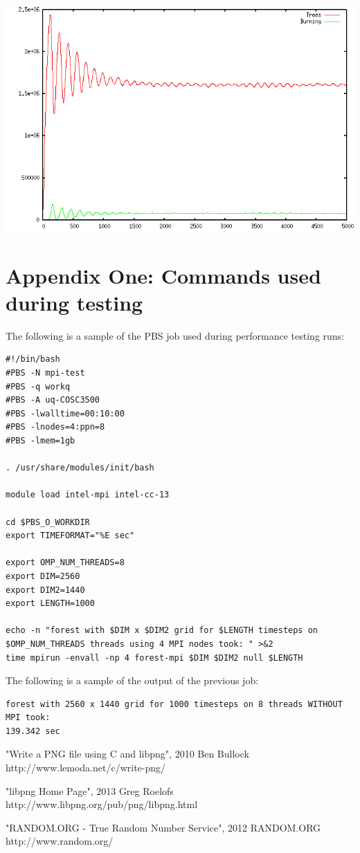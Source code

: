 \documentclass[11pt,a4paper]{report}
\begin{document}
\includegraphics[scale=0.8]{tex/graph}


\newpage

\appendix
\chapter{Appendix One: Commands used during testing}

The following is a sample of the PBS job used during performance testing runs:
\begin{verbatim}
#!/bin/bash
#PBS -N mpi-test
#PBS -q workq
#PBS -A uq-COSC3500
#PBS -lwalltime=00:10:00
#PBS -lnodes=4:ppn=8
#PBS -lmem=1gb

. /usr/share/modules/init/bash

module load intel-mpi intel-cc-13

cd $PBS_O_WORKDIR
export TIMEFORMAT="%E sec"

export OMP_NUM_THREADS=8
export DIM=2560
export DIM2=1440
export LENGTH=1000

echo -n "forest with $DIM x $DIM2 grid for $LENGTH timesteps on
$OMP_NUM_THREADS threads using 4 MPI nodes took: " >&2
time mpirun -envall -np 4 forest-mpi $DIM $DIM2 null $LENGTH
\end{verbatim}

The following is a sample of the output of the previous job:
\begin{verbatim}
forest with 2560 x 1440 grid for 1000 timesteps on 8 threads WITHOUT MPI took:
139.342 sec
\end{verbatim}

\begin{thebibliography}{99}

"Write a PNG file using C and libpng", 2010 Ben Bullock
http://www.lemoda.net/c/write-png/

"libpng Home Page", 2013 Greg Roelofs
http://www.libpng.org/pub/png/libpng.html

"RANDOM.ORG - True Random Number Service", 2012 RANDOM.ORG
http://www.random.org/

\end{thebibliography}
\end{document}
